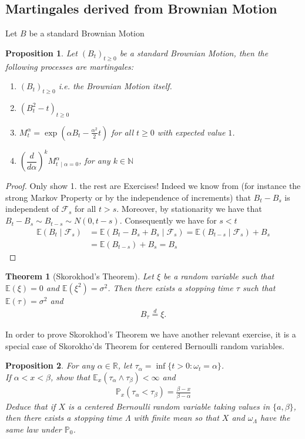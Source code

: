 \documentclass[11pt,a4paper, final]{article}
\newtheorem{thm}{Theorem}[section]
\newtheorem{prop}{Proposition}[section]
\theoremstyle{definition}
\begin{document}
\subsection{Martingales derived from Brownian Motion}
Let $B$ be a standard Brownian Motion
\begin{prop} Let $(B_t)_{t \geq 0}$ be a standard Brownian Motion, then the following processes are martingales:
\begin{enumerate}
\item $(B_t)_{t \geq 0}$ i.e. the Brownian Motion itself. 
\item $(B_t^2-t)_{t \geq 0}$ 
\item $M_t^\alpha = \exp\left( \alpha B_t - \frac{\alpha^2}{2}t \right)$ for all $t \geq 0$ with expected value $1$. 
\item $\left( \dfrac{d}{d \alpha} \right)^k M_{t \ \mid \alpha =0} ^\alpha$, for any $k \in \mathbb{N}$
\end{enumerate}
\end{prop}
\begin{proof} Only show 1. the rest are Exercises! Indeed we know from (for instance the strong Markov Property or by the independence of increments) that $B_t-B_s$ is independent of $\mathcal{F}_s$ for all $t>s$. Moreover, by stationarity we have that $B_t-B_s \sim B_{t-s} \sim N(0,t-s)$. Consequently we have for $s<t$ \begin{align*}
\mathbb{E}(B_t \mid \mathcal{F}_s)&= \mathbb{E}(B_t-B_s + B_s \mid \mathcal{F}_s) = \mathbb{E}(B_{t-s} \mid \mathcal{F}_s) + B_s \\
&= \mathbb{E}(B_{t-s} ) + B_s = B_s
\end{align*}
\end{proof}
\begin{thm}[Skorokhod's Theorem] Let $\xi$ be a random variable such that $\mathbb{E}( \xi)=0$ and $\mathbb{E}( \xi^2)= \sigma^2$. Then there exists a stopping time $\tau$ such that $\mathbb{E}( \tau)= \sigma^2$ and 
\begin{align*}
B_\tau \overset{d}= \xi. 
\end{align*}
\end{thm}
\noindent In order to prove Skorokhod's Theorem we have another relevant exercise, it is a special case of Skorokho'ds Theorem for centered Bernoulli random variables. 
\begin{prop} For any $\alpha \in \mathbb{R}$, let $\tau_\alpha = \inf \lbrace t >0 : \omega_t = \alpha \rbrace$. \\ If $\alpha < x < \beta$, show that $\mathbb{E}_x( \tau_\alpha \wedge \tau_\beta) < \infty$ and 
\begin{align*}
\mathbb{P}_x ( \tau_\alpha < \tau_\beta) = \frac{\beta-x}{\beta-\alpha}
\end{align*}
Deduce that if $X$ is a centered Bernoulli random variable taking values in $\lbrace a, \beta \rbrace$, then there exists a stopping time $\Lambda$ with finite mean so that $X$ and $\omega_\Lambda$ have the same law under $\mathbb{P}_0$. 
\end{prop}
\end{document}
